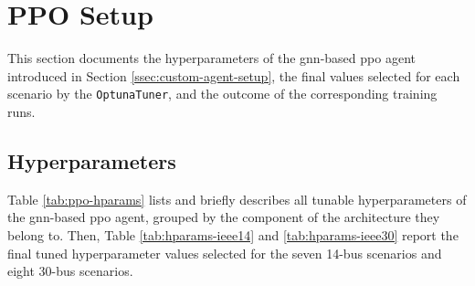 \FloatBarrier












\section{PPO Setup}\label{sec:exp-ppo-setup}
This section documents the hyperparameters of the \ac{gnn}-based \ac{ppo} agent introduced in Section \ref{ssec:custom-agent-setup}, the final values selected for each scenario by the \texttt{OptunaTuner}, and the outcome of the corresponding training runs.

\subsection{Hyperparameters}
Table \ref{tab:ppo-hparams} lists and briefly describes all tunable hyperparameters of the \ac{gnn}-based \ac{ppo} agent, grouped by the component of the architecture they belong to. Then, Table \ref{tab:hparams-ieee14} and \ref{tab:hparams-ieee30} report the final tuned hyperparameter values selected for the seven 14-bus scenarios and eight 30-bus scenarios.

